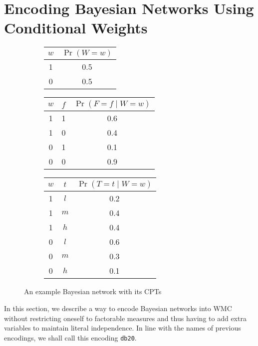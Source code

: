 \documentclass{article}
\theoremstyle{definition}
\theoremstyle{remark}
\begin{document}
{\section{Encoding Bayesian Networks Using Conditional Weights}

\begin{figure}
  \centering
  \begin{subfigure}{0.2\textwidth}
    \centering
  \end{subfigure}%
  \begin{subfigure}{0.8\textwidth}
    \centering
    \begin{tabular}[t]{cc}
      \toprule
      $w$ & $\Pr(W = w)$ \\
      \midrule
      1 & 0.5 \\
      0 & 0.5 \\
      \bottomrule
    \end{tabular}
    \begin{tabular}[t]{ccc}
      \toprule
      $w$ & $f$ & $\Pr(F = f \mid W = w)$ \\
      \midrule
      1 & 1 & 0.6 \\
      1 & 0 & 0.4 \\
      0 & 1 & 0.1 \\
      0 & 0 & 0.9 \\
      \bottomrule
    \end{tabular}
    \begin{tabular}[t]{ccc}
      \toprule
      $w$ & $t$ & $\Pr(T = t \mid W = w)$ \\
      \midrule
      1 & $l$ & 0.2 \\
      1 & $m$ & 0.4 \\
      1 & $h$ & 0.4 \\
      0 & $l$ & 0.6 \\
      0 & $m$ & 0.3 \\
      0 & $h$ & 0.1 \\
      \bottomrule
    \end{tabular}
  \end{subfigure}
  \caption{An example Bayesian network with its CPTs}
  \label{fig:example_bn}
\end{figure}

In this section, we describe a way to encode Bayesian networks into WMC without
restricting oneself to factorable measures and thus having to add extra
variables to maintain literal independence. In line with the names of previous
encodings, we shall call this encoding \texttt{db20}.

}
\end{document}
